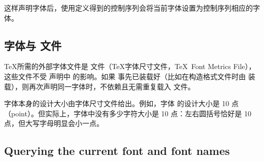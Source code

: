 \documentclass{book}
\begin{document}
这样声明字体后，使用定义得到的控制序列会将当前字体设置为控制序列相应的字体。

\subsection{字体与  文件}

\TeX 所需的外部字体文件是  文件（\TeX 字体尺寸文件，\TeX\ Font Metrics File），这些文件不受  声明中  的影响。如果  事先已装载好（比如在构造格式文件时由 \IniTeX 装载），则再次声明同一字体时，不依赖且无需重复载入  文件。

字体本身的设计大小由字体尺寸文件给出。例如，字体  的设计大小是 10 点（point）。但实际上，字体中没有多少字符大小是 10 点：左右圆括号恰好是 10 点，但大写字母明显会小一点。

\subsection{Querying the current font and font names}
\end{document}
